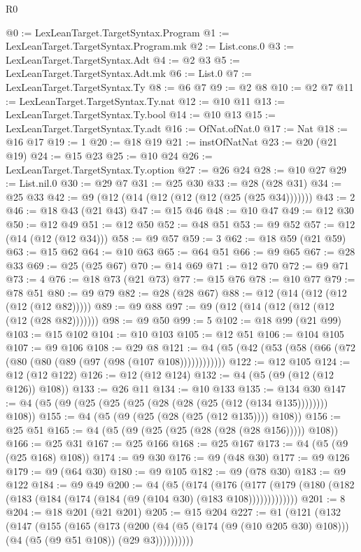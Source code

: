 \begin{lexlean}{R0}
\begin{coremodule}
@0 := LexLeanTarget.TargetSyntax.Program
@1 := LexLeanTarget.TargetSyntax.Program.mk
@2 := List.cons.{0}
@3 := LexLeanTarget.TargetSyntax.Adt
@4 := @2 @3
@5 := LexLeanTarget.TargetSyntax.Adt.mk
@6 := List.{0}
@7 := LexLeanTarget.TargetSyntax.Ty
@8 := @6 @7
@9 := @2 @8
@10 := @2 @7
@11 := LexLeanTarget.TargetSyntax.Ty.nat
@12 := @10 @11
@13 := LexLeanTarget.TargetSyntax.Ty.bool
@14 := @10 @13
@15 := LexLeanTarget.TargetSyntax.Ty.adt
@16 := OfNat.ofNat.{0}
@17 := Nat
@18 := @16 @17
@19 := 1
@20 := @18 @19
@21 := instOfNatNat
@23 := @20 (@21 @19)
@24 := @15 @23
@25 := @10 @24
@26 := LexLeanTarget.TargetSyntax.Ty.option
@27 := @26 @24
@28 := @10 @27
@29 := List.nil.{0}
@30 := @29 @7
@31 := @25 @30
@33 := @28 (@28 @31)
@34 := @25 @33
@42 := @9 (@12 (@14 (@12 (@12 (@12 (@25 (@25 @34)))))))
@43 := 2
@46 := @18 @43 (@21 @43)
@47 := @15 @46
@48 := @10 @47
@49 := @12 @30
@50 := @12 @49
@51 := @12 @50
@52 := @48 @51
@53 := @9 @52
@57 := @12 (@14 (@12 (@12 @34)))
@58 := @9 @57
@59 := 3
@62 := @18 @59 (@21 @59)
@63 := @15 @62
@64 := @10 @63
@65 := @64 @51
@66 := @9 @65
@67 := @28 @33
@69 := @25 (@25 @67)
@70 := @14 @69
@71 := @12 @70
@72 := @9 @71
@73 := 4
@76 := @18 @73 (@21 @73)
@77 := @15 @76
@78 := @10 @77
@79 := @78 @51
@80 := @9 @79
@82 := @28 (@28 @67)
@88 := @12 (@14 (@12 (@12 (@12 (@12 @82)))))
@89 := @9 @88
@97 := @9 (@12 (@14 (@12 (@12 (@12 (@12 (@28 @82)))))))
@98 := @9 @50
@99 := 5
@102 := @18 @99 (@21 @99)
@103 := @15 @102
@104 := @10 @103
@105 := @12 @51
@106 := @104 @105
@107 := @9 @106
@108 := @29 @8
@121 := @4 (@5 (@42 (@53 (@58 (@66 (@72 (@80 (@80 (@89 (@97 (@98 (@107 @108))))))))))))
@122 := @12 @105
@124 := @12 (@12 @122)
@126 := @12 (@12 @124)
@132 := @4 (@5 (@9 (@12 (@12 @126)) @108))
@133 := @26 @11
@134 := @10 @133
@135 := @134 @30
@147 := @4 (@5 (@9 (@25 (@25 (@25 (@28 (@28 (@25 (@12 (@134 @135)))))))) @108))
@155 := @4 (@5 (@9 (@25 (@28 (@25 (@12 @135)))) @108))
@156 := @25 @51
@165 := @4 (@5 (@9 (@25 (@25 (@28 (@28 (@28 @156))))) @108))
@166 := @25 @31
@167 := @25 @166
@168 := @25 @167
@173 := @4 (@5 (@9 (@25 @168) @108))
@174 := @9 @30
@176 := @9 (@48 @30)
@177 := @9 @126
@179 := @9 (@64 @30)
@180 := @9 @105
@182 := @9 (@78 @30)
@183 := @9 @122
@184 := @9 @49
@200 := @4
    (@5
      (@174
        (@176 (@177 (@179 (@180 (@182 (@183 (@184 (@174 (@184 (@9 (@104 @30) (@183 @108)))))))))))))
@201 := 8
@204 := @18 @201 (@21 @201)
@205 := @15 @204
@227 := @1
    (@121
      (@132
        (@147
          (@155
            (@165
              (@173
                (@200
                  (@4 (@5 (@174 (@9 (@10 @205 @30) @108))) (@4 (@5 (@9 @51 @108)) (@29 @3))))))))))

\end{coremodule}
\end{lexlean}

